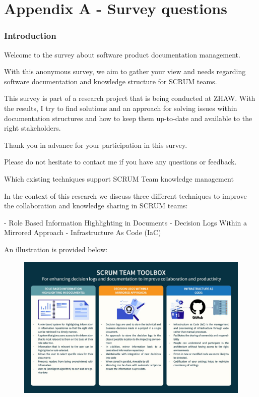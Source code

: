 

\chapter{Appendix A - Survey questions} %

\label{ApendixA} %

\subsection*{Introduction}

Welcome to the survey about software product documentation management.

With this anonymous survey, we aim to gather your view and needs regarding software documentation and knowledge structure for SCRUM teams.

This survey is part of a research project that is being conducted at ZHAW. With the results, I try to find solutions and an approach for solving issues within documentation structures and how to keep them up-to-date and available to the right stakeholders.

Thank you in advance for your participation in this survey.

Please do not hesitate to contact me if you have any questions or feedback.

Which existing techniques support SCRUM Team knowledge management

In the context of this research we discuss three different techniques to improve the collaboration and knowledge sharing in SCRUM teams:

- Role Based Information Highlighting in Documents
- Decision Logs Within a Mirrored Approach
- Infrastructure As Code (IaC)

An illustration is provided below:

\begin{figure}[h!]
\centering
\includegraphics[width=\linewidth]{Images/toolbox.jpg}
\end{figure}

